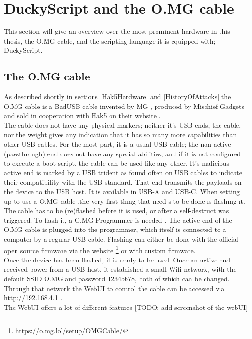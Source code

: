 \section{DuckyScript and the O.MG cable}


This section will give an overview over the most prominent hardware in this thesis, the O.MG cable, and the scripting language it is equipped with; DuckyScript. 

\subsection{The O.MG cable} \label{theOMGCable}

As described shortly in sections \ref{Hak5Hardware} and \ref{HistoryOfAttacks} the O.MG cable is a BadUSB cable invented by MG \cite{MGCable2019a}, produced by Mischief Gadgets \cite{hak5MischiefGadgets} and sold in cooperation with Hak5 on their website \cite{hak5MischiefGadgets}. \\
The cable does not have any physical markers; neither it's USB ends, the cable, nor the weight gives any indication that it has so many more capabilities than other USB cables. For the most part, it is a usual USB cable; the non-active (passthrough) end does not have any special abilities, and if it is not configured to execute a boot script, the cable can be used like any other. It's malicious active end is marked by a USB trident as found often on USB cables to indicate their compatibility with the USB standard. That end transmits the payloads on the device to the USB host. It is available in USB-A and USB-C.
When setting up to use a O.MG cable ,the very first thing that need s to be done is flashing it. The cable has to be (re)flashed before it is used, or after a self-destruct was triggered. To flash it, a O.MG Programmer is needed \cite{hak5MGCable}. The active end of the O.MG cable is plugged into the programmer, which itself is connected to a computer by a regular USB cable. Flashing can either be done with the official open source firmware \cite{DuckyScriptSyntaxGuide} via the website \footnote{https://o.mg.lol/setup/OMGCable/} or with custom firmware. \\  
Once the device has been flashed, it is ready to be used. Once an active end received power from a USB host, it established a small Wifi network, with the default SSID O.MG and password 12345678, both of which can be changed. Through that network the WebUI to control the cable can be accessed via http://192.168.4.1 . \\
The WebUI offers a lot of different features [TODO; add screenshot of the webUI]

